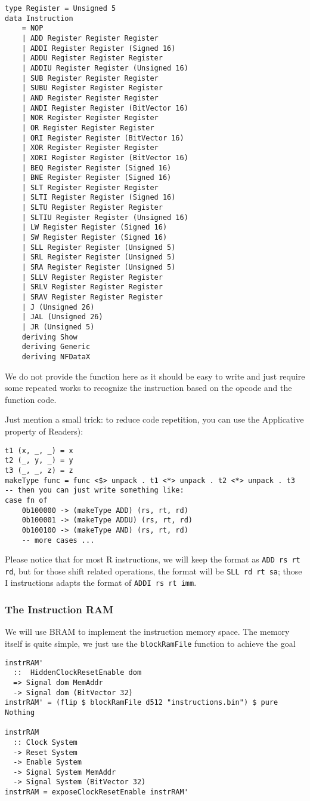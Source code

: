 \begin{verbatim}
type Register = Unsigned 5
data Instruction
    = NOP
    | ADD Register Register Register
    | ADDI Register Register (Signed 16)
    | ADDU Register Register Register
    | ADDIU Register Register (Unsigned 16)
    | SUB Register Register Register
    | SUBU Register Register Register
    | AND Register Register Register
    | ANDI Register Register (BitVector 16)
    | NOR Register Register Register
    | OR Register Register Register
    | ORI Register Register (BitVector 16)
    | XOR Register Register Register
    | XORI Register Register (BitVector 16)
    | BEQ Register Register (Signed 16)
    | BNE Register Register (Signed 16)
    | SLT Register Register Register
    | SLTI Register Register (Signed 16)
    | SLTU Register Register Register
    | SLTIU Register Register (Unsigned 16)
    | LW Register Register (Signed 16)
    | SW Register Register (Signed 16)
    | SLL Register Register (Unsigned 5)
    | SRL Register Register (Unsigned 5)
    | SRA Register Register (Unsigned 5)
    | SLLV Register Register Register
    | SRLV Register Register Register
    | SRAV Register Register Register
    | J (Unsigned 26)
    | JAL (Unsigned 26)
    | JR (Unsigned 5)
    deriving Show
    deriving Generic
    deriving NFDataX
\end{verbatim}
We do not provide the function  here as it should be easy to write and just require some repeated works to recognize the instruction based on the opcode and the function code.

Just mention a small trick: to reduce code repetition, you can use the Applicative property of Readers):
\begin{verbatim}
t1 (x, _, _) = x
t2 (_, y, _) = y
t3 (_, _, z) = z
makeType func = func <$> unpack . t1 <*> unpack . t2 <*> unpack . t3
-- then you can just write something like:
case fn of
    0b100000 -> (makeType ADD) (rs, rt, rd)
    0b100001 -> (makeType ADDU) (rs, rt, rd)
    0b100100 -> (makeType AND) (rs, rt, rd)
    -- more cases ...
\end{verbatim}
Please notice that for most R instructions, we will keep the format as \texttt{ADD rs rt rd}, but for those shift related operations, the format will be \texttt{SLL rd rt sa}; those I instructions adapts the format of \texttt{ADDI rs rt imm}.
\subsubsection{The Instruction RAM}
We will use BRAM to implement the instruction memory space. The memory itself is quite simple, we just use the  \texttt{blockRamFile} function to achieve the goal
\begin{verbatim}
instrRAM' 
  ::  HiddenClockResetEnable dom
  => Signal dom MemAddr
  -> Signal dom (BitVector 32)
instrRAM' = (flip $ blockRamFile d512 "instructions.bin") $ pure Nothing

instrRAM 
  :: Clock System
  -> Reset System
  -> Enable System
  -> Signal System MemAddr
  -> Signal System (BitVector 32)
instrRAM = exposeClockResetEnable instrRAM'
\end{verbatim}
